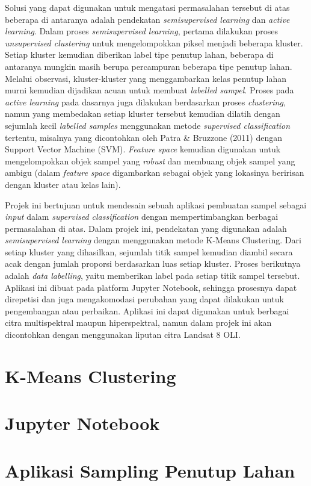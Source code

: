 \documentclass[a4paper,12pt]{article}
\begin{document}
Solusi yang dapat digunakan untuk mengatasi permasalahan tersebut di atas beberapa di antaranya adalah pendekatan \textit{semisupervised learning} dan \textit{active learning}. Dalam proses \textit{semisupervised learning}, pertama dilakukan proses \textit{unsupervised clustering} untuk mengelompokkan piksel menjadi beberapa kluster. Setiap kluster kemudian diberikan label tipe penutup lahan, beberapa di antaranya mungkin masih berupa percampuran beberapa tipe penutup lahan. Melalui observasi, kluster-kluster yang menggambarkan kelas penutup lahan murni kemudian dijadikan acuan untuk membuat \textit{labelled sampel}. Proses pada \textit{active learning} pada dasarnya juga dilakukan berdasarkan proses \textit{clustering}, namun yang membedakan setiap kluster tersebut kemudian dilatih dengan sejumlah kecil \textit{labelled samples} menggunakan metode \textit{supervised classification} tertentu, misalnya yang dicontohkan oleh Patra \& Bruzzone (2011) dengan Support Vector Machine (SVM). \textit{Feature space} kemudian digunakan untuk mengelompokkan objek sampel yang \textit{robust} dan membuang objek sampel yang ambigu (dalam \textit{feature space} digambarkan sebagai objek yang lokasinya beririsan dengan kluster atau kelas lain). \par

Projek ini bertujuan untuk mendesain sebuah aplikasi pembuatan sampel sebagai \textit{input} dalam \textit{supervised classification} dengan mempertimbangkan berbagai permasalahan di atas. Dalam projek ini, pendekatan yang digunakan adalah \textit{semisupervised learning} dengan menggunakan metode K-Means Clustering. Dari setiap kluster yang dihasilkan, sejumlah titik sampel kemudian diambil secara acak dengan jumlah proporsi berdasarkan luas setiap kluster. Proses berikutnya adalah \textit{data labelling}, yaitu memberikan label pada setiap titik sampel tersebut. Aplikasi ini dibuat pada platform Jupyter Notebook, sehingga prosesnya dapat direpetisi dan juga mengakomodasi perubahan yang dapat dilakukan untuk pengembangan atau perbaikan. Aplikasi ini dapat digunakan untuk berbagai citra multispektral maupun hiperspektral, namun dalam projek ini akan dicontohkan dengan menggunakan liputan citra Landsat 8 OLI.

\section{K-Means Clustering}

\section{Jupyter Notebook}

\section{Aplikasi Sampling Penutup Lahan}
\end{document}
